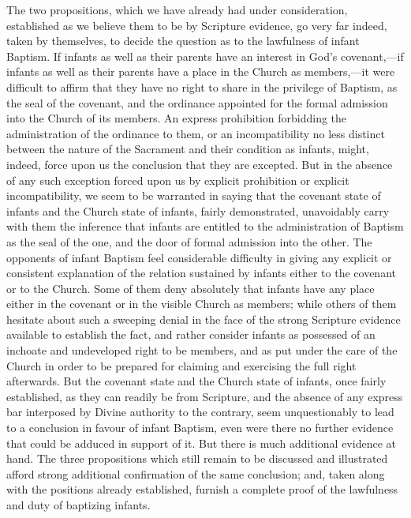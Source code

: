 \documentclass[
  english,
]{book}
\begin{document}
The two propositions, which we have already had under consideration, established as we believe them to be by Scripture evidence, go very far indeed, taken by themselves, to decide the question as to the lawfulness of infant Baptism. If infants as well as their parents have an interest in God's covenant,---if infants as well as their parents have a place in the Church as members,---it were difficult to affirm that they have no right to share in the privilege of Baptism, as the seal of the covenant, and the ordinance appointed for the formal admission into the Church of its members. An express prohibition forbidding the administration of the ordinance to them, or an incompatibility no less distinct between the nature of the Sacrament and their condition as infants, might, indeed, force upon us the conclusion that they are excepted. But in the absence of any such exception forced upon us by explicit prohibition or explicit incompatibility, we seem to be warranted in saying that the covenant state of infants and the Church state of infants, fairly demonstrated, unavoidably carry with them the inference that infants are entitled to the administration of Baptism as the seal of the one, and the door of formal admission into the other. The opponents of infant Baptism feel considerable difficulty in giving any explicit or consistent explanation of the relation sustained by infants either to the covenant or to the Church. Some of them deny absolutely that infants have any place either in the covenant or in the visible Church as members; while others of them hesitate about such a sweeping denial in the face of the strong Scripture evidence available to establish the fact, and rather consider infants as possessed of an inchoate and undeveloped right to be members, and as put under the care of the Church in order to be prepared for claiming and exercising the full right afterwards. But the covenant state and the Church state of infants, once fairly established, as they can readily be from Scripture, and the absence of any express bar interposed by Divine authority to the contrary, seem unquestionably to lead to a conclusion in favour of infant Baptism, even were there no further evidence that could be adduced in support of it. But there is much additional evidence at hand. The three propositions which still remain to be discussed and illustrated afford strong additional confirmation of the same conclusion; and, taken along with the positions already established, furnish a complete proof of the lawfulness and duty of baptizing infants.
\end{document}
